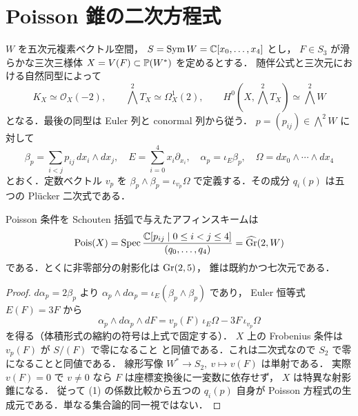 \section{Poisson 錐の二次方程式}
$W$ を五次元複素ベクトル空間，
$S=\operatorname{Sym} W=\mathbb C[x_0,\ldots,x_4]$ とし，
$F\in S_3$ が滑らかな三次三様体
$X=V(F)\subset\mathbb P(W^*)$ を定めるとする．
随伴公式と三次元における自然同型によって
\[
K_X\simeq\mathcal O_X(-2),\qquad
\bigwedge^2T_X\simeq\Omega_X^1(2),\qquad
H^0(X,\bigwedge^2T_X)\simeq\bigwedge^2W
\]
となる．最後の同型は Euler 列と conormal 列から従う．
$p=(p_{ij})\in\bigwedge^2W$ に対して
\[
\beta_p=\sum_{i<j}p_{ij}\,dx_i\wedge dx_j,\quad
E=\sum_{i=0}^4x_i\partial_{x_i},\quad
\alpha_p=\iota_E\beta_p,\quad
\Omega=dx_0\wedge\cdots\wedge dx_4
\]
とおく．定数ベクトル $v_p$ を
$\beta_p\wedge\beta_p=\iota_{v_p}\Omega$
で定義する．その成分 $q_i(p)$ は五つの Pl\"ucker 二次式である．

\begin{theorem}
\label{thm:cone}
Poisson 条件を Schouten 括弧で与えたアフィンスキームは
\[
\operatorname{Pois}(X)
=\operatorname{Spec}\frac{\mathbb C[p_{ij}\mid0\le i<j\le4]}
{(q_0,\ldots,q_4)}
=\widehat{\operatorname{Gr}}(2,W)
\]
である．とくに非零部分の射影化は $\operatorname{Gr}(2,5)$，
錐は既約かつ七次元である．
\end{theorem}
\begin{proof}
$d\alpha_p=2\beta_p$ より
$\alpha_p\wedge d\alpha_p=\iota_E(\beta_p\wedge\beta_p)$ であり，
Euler 恒等式 $E(F)=3F$ から
\[
\alpha_p\wedge d\alpha_p\wedge dF
=v_p(F)\,\iota_E\Omega-3F\,\iota_{v_p}\Omega
\tag{1}
\]
を得る（体積形式の縮約の符号は上式で固定する）．
$X$ 上の Frobenius 条件は $v_p(F)$ が $S/(F)$ で零になること
と同値である．これは二次式なので $S_2$ で零になることと同値である．
線形写像 $W^*\to S_2,\ v\mapsto v(F)$ は単射である．
実際 $v(F)=0$ で $v\ne0$ なら $F$ は座標変換後に一変数に依存せず，
$X$ は特異な射影錐になる．
従って (1) の係数比較から五つの $q_i(p)$ 自身が
Poisson 方程式の生成元である．単なる集合論的同一視ではない．
\end{proof}

